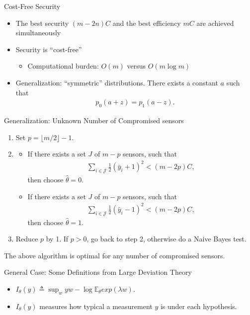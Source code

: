 \documentclass[10pt]{beamer}
\newcommand{\tikzdir}[1]{#1.tikz}
\newcommand{\inputtikz}[1]{}}
\begin{document}
\begin{frame}{Cost-Free Security}
  \begin{itemize}
  \item The best security $(m-2n)C$ and the best efficiency $mC$ are achieved simultaneously
  \item Security is ``cost-free''
    \begin{itemize}
    \item Computational burden: $O(m)$ versus $O(m\log m)$
    \end{itemize}
  \item Generalization: ``symmetric'' distributions. There exists a constant $a$ such that 
    \begin{align*}
      p_0(a+z) = p_1(a-z).
    \end{align*}
  \end{itemize}
\end{frame}

\begin{frame}{Generalization: Unknown Number of Compromised sensors}
  \begin{enumerate}
  \item Set $p = \lfloor m/2\rfloor -1$.
  \item 
    \begin{itemize}
    \item If there exists a set $J$ of $m-p$ sensors, such that
      \begin{align*}
        \sum_{i\in \mathcal J}\frac{1}{2}(\bar y_i+1)^2 < (m-2p)C,
      \end{align*}
      then choose $\hat \theta = 0$. 
    \item If there exists a set $J$ of $m-p$ sensors, such that
      \begin{align*}
        \sum_{i\in \mathcal J}\frac{1}{2}(\bar y_i-1)^2 < (m-2p)C,
      \end{align*}
      then choose $\hat \theta = 1$. 
    \end{itemize}
  \item Reduce $p$ by 1. If $p > 0$, go back to step 2, otherwise do a Naive Bayes test.
  \end{enumerate}
  The above algorithm is optimal for any number of compromised sensors.
\end{frame}

\begin{frame}{General Case: Some Definitions from Large Deviation Theory}
  \begin{center}
    \inputtikz{rate_function}
  \end{center}
  \begin{itemize}
  \item $I_\theta(y) \triangleq \sup_{w} yw - \log \mathbb E_\theta exp(\lambda w).$
  \item $I_\theta(y)$ measures how typical a measurement $y$ is under each hypothesis.
  \end{itemize}
\end{frame}
\end{document}
